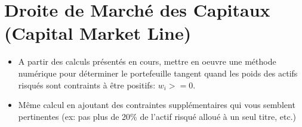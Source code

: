 \documentclass[
]{article}
\begin{document}
\hypertarget{droite-de-marchuxe9-des-capitaux-capital-market-line}{%
\section{Droite de Marché des Capitaux (Capital Market
Line)}\label{droite-de-marchuxe9-des-capitaux-capital-market-line}}

\begin{itemize}
\item
  A partir des calculs présentés en cours, mettre en oeuvre une méthode
  numérique pour déterminer le portefeuille tangent quand les poids des
  actifs risqués sont contraints à être positifs: \(w_i >= 0\).
\item
  Même calcul en ajoutant des contraintes supplémentaires qui vous
  semblent pertinentes (ex: pas plus de 20\% de l'actif risqué alloué à
  un seul titre, etc.)
\end{itemize}
\end{document}
